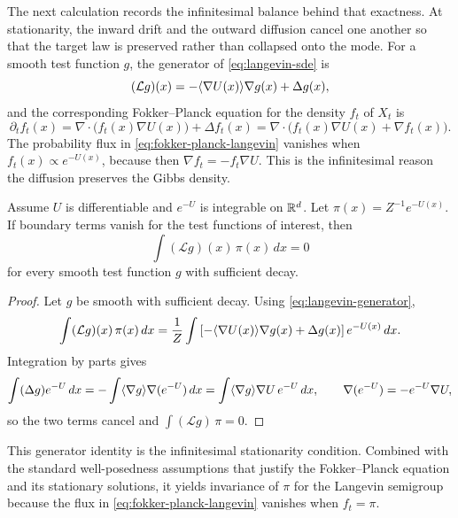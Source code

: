 The next calculation records the infinitesimal balance behind that exactness.
At stationarity, the inward drift and the outward diffusion cancel one another so that the target law is preserved rather than collapsed onto the mode.
For a smooth test function $g$, the generator of \eqref{eq:langevin-sde} is
\begin{equation}
  (\mathcal{L}g)(x)
  =
  -\langle\nabla U(x)\rangle{\nabla g(x)} + \Delta g(x),
  \label{eq:langevin-generator}
\end{equation}
and the corresponding Fokker--Planck equation for the density $f_t$ of $X_t$ is
\begin{equation}
  \partial_t f_t(x)
  =
  \nabla\cdot\bigl(f_t(x)\nabla U(x)\bigr)+\Delta f_t(x)
  =
  \nabla\cdot\bigl(f_t(x)\nabla U(x)+\nabla f_t(x)\bigr).
  \label{eq:fokker-planck-langevin}
\end{equation}
The probability flux in \eqref{eq:fokker-planck-langevin} vanishes when $f_t(x)\propto e^{-U(x)}$, because then $\nabla f_t=-f_t\nabla U$.
This is the infinitesimal reason the diffusion preserves the Gibbs density.

\begin{proposition}
\label{prop:langevin-stationary}
Assume $U$ is differentiable and $e^{-U}$ is integrable on $\mathbb{R}^d$.
Let $\pi(x)=Z^{-1}e^{-U(x)}$.
If boundary terms vanish for the test functions of interest, then
\[
  \int (\mathcal{L}g)(x)\,\pi(x)\,dx = 0
\]
for every smooth test function $g$ with sufficient decay.
\end{proposition}
\begin{proof}
Let $g$ be smooth with sufficient decay.
Using \eqref{eq:langevin-generator},
\[
  \int (\mathcal{L}g)(x)\,\pi(x)\,dx
  =
  \frac{1}{Z}\int \left[-\langle\nabla U(x)\rangle{\nabla g(x)}+\Delta g(x)\right]e^{-U(x)}\,dx.
\]
Integration by parts gives
\[
  \int (\Delta g)e^{-U}\,dx
  =
  -\int \langle\nabla g\rangle{\nabla(e^{-U})}\,dx
  =
  \int \langle\nabla g\rangle{\nabla U}\,e^{-U}\,dx,
  \qquad
  \nabla(e^{-U})=-e^{-U}\nabla U,
\]
so the two terms cancel and $\int (\mathcal{L}g)\,\pi=0$.
\end{proof}
This generator identity is the infinitesimal stationarity condition.
Combined with the standard well-posedness assumptions that justify the Fokker--Planck equation and its stationary solutions, it yields invariance of \(\pi\) for the Langevin semigroup because the flux in \eqref{eq:fokker-planck-langevin} vanishes when \(f_t=\pi\).

